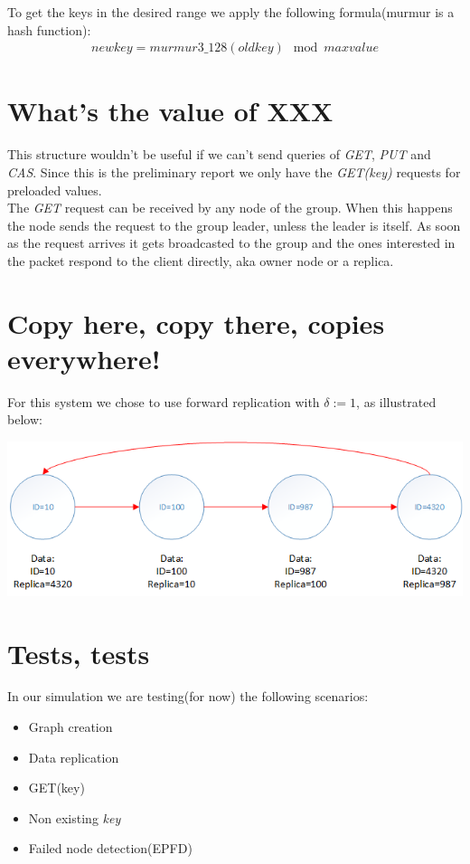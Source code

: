 \documentclass[a4paper, 11pt]{article}
\begin{document}
\noindent To get the keys in the desired range we apply the following formula(murmur is a hash function):
\begin{gather*}
newkey = murmur3\_128(oldkey) \mod{maxvalue}
\end{gather*}

\section{What's the value of XXX}

\noindent This structure wouldn't be useful if we can't send queries of \textit{GET}, \textit{PUT} and \textit{CAS}. Since this is the preliminary report we only have the \textit{GET(key)} requests for preloaded values. \\
The \textit{GET} request can be received by any node of the group. When this happens the node sends the request to the group leader, unless the leader is itself. As soon as the request arrives it gets broadcasted to the group and the ones interested in the packet respond to the client directly, aka owner node or a replica.

\section{Copy here, copy there, copies everywhere!}

\noindent For this system we chose to use forward replication with $\delta := 1$, as illustrated below: 

{\centering\includegraphics[scale = 0.8]{./figures/replication.png}\par}


\section{Tests, tests}

\noindent In our simulation we are testing(for now) the following scenarios:
\begin{itemize}
	\item Graph creation
	\item Data replication
	\item GET(key)
	\item Non existing \textit{key}
	\item Failed node detection(EPFD)
\end{itemize}
\end{document}
